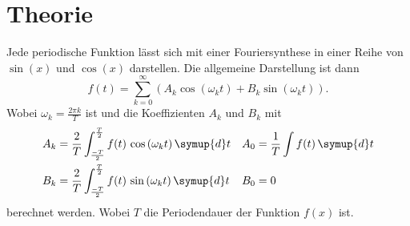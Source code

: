 \section{Theorie}
\label{sec:Theorie}

Jede periodische Funktion lässt sich mit einer Fouriersynthese in einer Reihe von $\sin(x)$ und $\cos(x)$ darstellen. Die allgemeine Darstellung ist dann 
\begin{equation}
    \label{eq:Fouriersynthese}
    f (t) = \sum_{k=0}^\infty \left(A_k \cos \left( \omega _k t \right) + B_k \sin \left( \omega _k t \right) \right).
\end{equation}
Wobei $\omega _k = \frac {2 \pi k}{T}$ ist und die Koeffizienten $A_k$ und $B_k$ mit 
\begin{align}
    A_k &= \frac{2}{T} \int_{\frac{-T}{2}}^{\frac{T}{2}} f(t) \, \cos \left( \omega _k t \right)  \symup{d}t & A_0 &= \frac{1}{T} \int f (t) \, \symup{d}t \label{eq:A_k} \\
    B_k &= \frac{2}{T} \int_{\frac{-T}{2}}^{\frac{T}{2}} f(t) \, \sin \left( \omega _k t \right)  \symup{d}t & B_0 &= 0 \label{eq:B_k}
\end{align}
berechnet werden. Wobei $T$ die Periodendauer der Funktion $f(x)$ ist. \cite{V802}